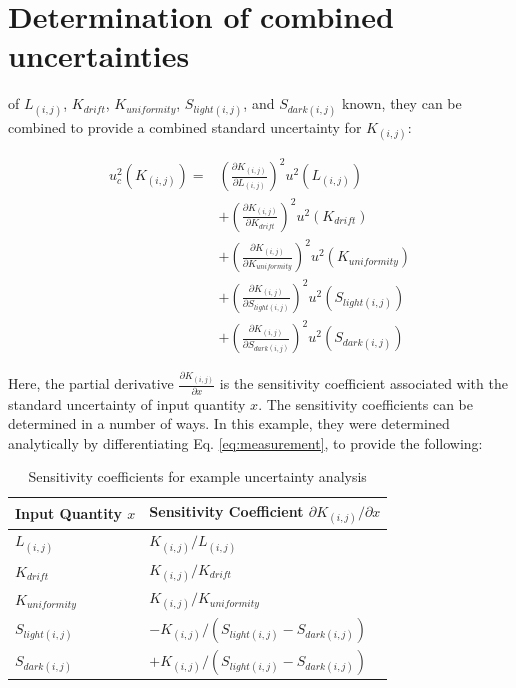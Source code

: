 \documentclass[nohyper,nobib]{tufte-book}
\begin{document}
\section{Determination of combined uncertainties}

 of $L_{(i,j)}$, $K_{drift}$, $K_{uniformity}$, $S_{light(i,j)}$, and $S_{dark(i,j)}$ known, they can be combined to provide a combined standard uncertainty for $K_{(i,j)}$:

\begin{equation}
\label{eq:combined}
\begin{aligned}
u_{c}^{2}\left(K_{(i,j)}\right) = {} & \left( \frac{\partial K_{(i,j)}}{\partial L_{(i,j)}} \right)^{2} u^{2}\left(L_{(i,j)}\right) \\
& + \left( \frac{\partial K_{(i,j)}}{\partial K_{drift}} \right)^{2} u^{2}\left(K_{drift}\right) \\
& + \left( \frac{\partial K_{(i,j)}}{\partial K_{uniformity}} \right)^{2} u^{2}\left(K_{uniformity}\right) \\
& + \left( \frac{\partial K_{(i,j)}}{\partial S_{light(i,j)}} \right)^{2} u^{2}\left(S_{light(i,j)}\right) \\
& + \left( \frac{\partial K_{(i,j)}}{\partial S_{dark(i,j)}} \right)^{2} u^{2}\left(S_{dark(i,j)}\right)
\end{aligned}
\end{equation}

Here, the partial derivative $\frac{\partial K_{(i,j)}}{\partial x}$ is the sensitivity coefficient associated with the standard uncertainty of input quantity $x$. The sensitivity coefficients can be determined in a number of ways. In this example, they were determined analytically by differentiating Eq. \ref{eq:measurement}, to provide the following:

\begin{table}[h]
\centering
\begin{tabular}{@{}ll@{}}
\toprule
Input Quantity $x$ & Sensitivity Coefficient $\partial K_{(i,j)} / \partial x$ \\ \midrule
 $L_{(i,j)}$ & $K_{(i,j)} / L_{(i,j)}$ \\
 $K_{drift}$ & $K_{(i,j)} / K_{drift}$ \\
 $K_{uniformity}$ & $K_{(i,j)} / K_{uniformity}$ \\
 $S_{light(i,j)}$ & $-K_{(i,j)} / \left(S_{light(i,j)} - S_{dark(i,j)}\right)$ \\
 $S_{dark(i,j)}$ & $+K_{(i,j)} / \left(S_{light(i,j)} - S_{dark(i,j)}\right)$ \\ \bottomrule
\end{tabular}
\caption{Sensitivity coefficients for example uncertainty analysis}
\label{tab:my-table-4}
\end{table}
\end{document}
